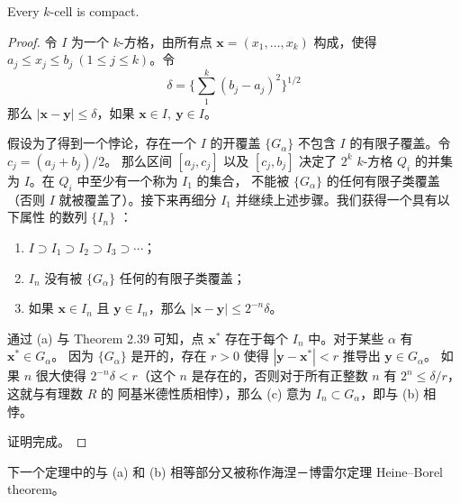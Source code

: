 \documentclass[../poma-notes.tex]{subfiles}
\begin{document}
\begin{theorem}
  Every $k$-cell is compact.
\end{theorem}

\begin{proof}
  令 $I$ 为一个 $k$-方格，由所有点 $\mathbf{x}=(x_1,\dots,x_k)$ 构成，使得 $a_j \le x_j \le b_j \ (1 \le j \le k)$。令
  \[\delta = \biggl\{\sum_{1}^{k}(b_j - a_j)^2\biggr\}^{1/2}\]
  那么 $|\mathbf{x} - \mathbf{y}| \le \delta$，如果 $\mathbf{x} \in I,\ \mathbf{y} \in I$。

  假设为了得到一个悖论，存在一个 $I$ 的开覆盖 $\{G_{\alpha}\}$ 不包含 $I$ 的有限子覆盖。令 $c_j = (a_j + b_j) / 2$。
  那么区间 $[a_j, c_j]$ 以及 $[c_j, b_j]$ 决定了 $2^k$ $k$-方格 $Q_i$ 的并集为 $I$。在 $Q_i$ 中至少有一个称为 $I_1$ 的集合，
  不能被 $\{G_{\alpha}\}$ 的任何有限子类覆盖（否则 $I$ 就被覆盖了）。接下来再细分 $I_1$ 并继续上述步骤。我们获得一个具有以下属性
  的数列 $\{I_n\}$ ：
  \begin{enumerate}[label=(\alph*)]
    \item $I \supset I_1 \supset I_2 \supset I_3 \supset \cdots$；
    \item $I_n$ 没有被 $\{G_{\alpha}\}$ 任何的有限子类覆盖；
    \item 如果 $\mathbf{x} \in I_n$ 且 $\mathbf{y} \in I_n$，那么 $|\mathbf{x} - \mathbf{y}| \le 2^{-n} \delta$。
  \end{enumerate}

  通过 (a) 与 Theorem 2.39 可知，点 $\mathbf{x}^*$ 存在于每个 $I_n$ 中。对于某些 $\alpha$ 有 $\mathbf{x}^* \in G_{\alpha}$。
  因为 $\{G_{\alpha}\}$ 是开的，存在 $r>0$ 使得 $|\mathbf{y} - \mathbf{x}^*| < r$ 推导出 $\mathbf{y} \in G_{\alpha}$。
  如果 $n$ 很大使得 $2^{-n}\delta<r$（这个 $n$ 是存在的，否则对于所有正整数 $n$ 有 $2^{n} \le \delta/r$，这就与有理数 $R$ 的
  阿基米德性质相悖），那么 (c) 意为 $I_n \subset G_{\alpha}$，即与 (b) 相悖。

  证明完成。
\end{proof}

下一个定理中的与 (a) 和 (b) 相等部分又被称作海涅－博雷尔定理 Heine–Borel theorem。
\end{document}
